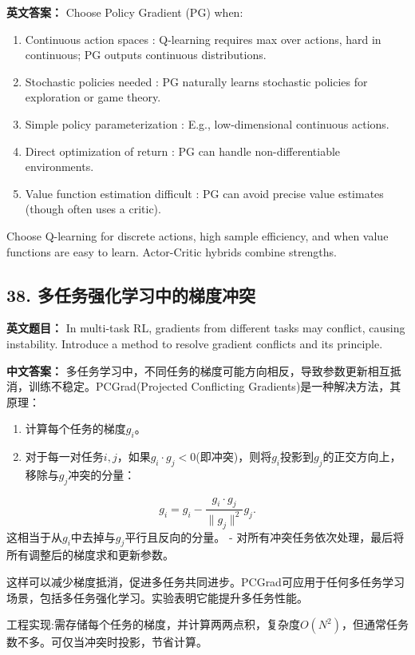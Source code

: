 \documentclass[10pt,a4paper]{ctexart}
\begin{document}
\textbf{英文答案：}  
Choose Policy Gradient (PG) when:
\begin{enumerate}
    \item Continuous action spaces : Q-learning requires max over actions, hard in continuous; PG outputs continuous distributions.
    \item Stochastic policies needed : PG naturally learns stochastic policies for exploration or game theory.
    \item Simple policy parameterization : E.g., low-dimensional continuous actions.
    \item Direct optimization of return : PG can handle non-differentiable environments.
    \item Value function estimation difficult : PG can avoid precise value estimates (though often uses a critic).
\end{enumerate}

Choose Q-learning for discrete actions, high sample efficiency, and when value functions are easy to learn. Actor-Critic hybrids combine strengths.

\subsection*{38. 多任务强化学习中的梯度冲突}
\textbf{英文题目：} In multi-task RL, gradients from different tasks may conflict, causing instability. Introduce a method to resolve gradient conflicts and its principle.

\textbf{中文答案：}  
多任务学习中，不同任务的梯度可能方向相反，导致参数更新相互抵消，训练不稳定。PCGrad(Projected Conflicting Gradients)是一种解决方法，其原理：

\begin{enumerate}
    \item 计算每个任务的梯度\(g_i\)。
    \item 对于每一对任务\(i,j\)，如果\(g_i \cdot g_j < 0\)(即冲突)，则将\(g_i\)投影到\(g_j\)的正交方向上，移除与\(g_j\)冲突的分量：
\end{enumerate}
  \[
  g_i = g_i - \frac{g_i \cdot g_j}{\|g_j\|^2} g_j.
  \]  
  这相当于从\(g_i\)中去掉与\(g_j\)平行且反向的分量。
- 对所有冲突任务依次处理，最后将所有调整后的梯度求和更新参数。

这样可以减少梯度抵消，促进多任务共同进步。PCGrad可应用于任何多任务学习场景，包括多任务强化学习。实验表明它能提升多任务性能。

 工程实现:需存储每个任务的梯度，并计算两两点积，复杂度\(O(N^2)\)，但通常任务数不多。可仅当冲突时投影，节省计算。
\end{document}

